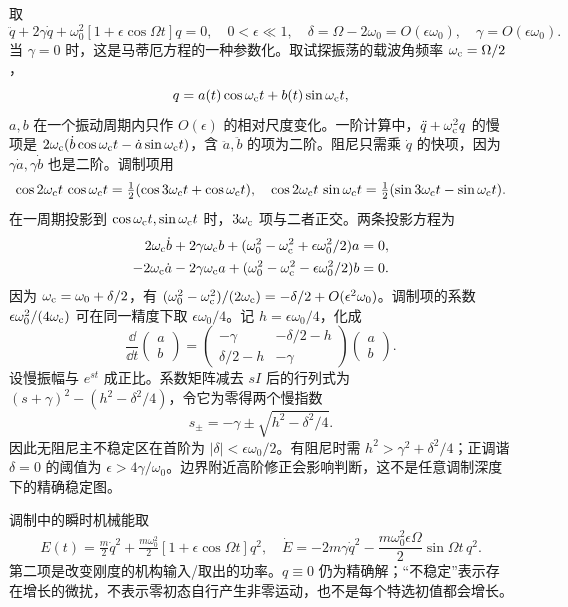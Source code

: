 \begin{example}[刚度调制如何克服阻尼]
取
\begin{equation}
\ddot q+2\gamma\dot q+\omega_0^2[1+\epsilon\cos\Omega t]q=0,
\quad 0<\epsilon\ll1,\quad
\delta=\Omega-2\omega_0=O(\epsilon\omega_0),\quad
\gamma=O(\epsilon\omega_0).
\label{eq:mathieu}
\end{equation}
当 $\gamma=0$ 时，这是马蒂厄方程的一种参数化。取试探振荡的载波角频率 $\omega_{\rm c}=\Omega/2$，
\[
q=a(t)\cos\omega_{\rm c} t+b(t)\sin\omega_{\rm c} t,
\]
$a,b$ 在一个振动周期内只作 $O(\epsilon)$ 的相对尺度变化。一阶计算中，$\ddot q+\omega_{\rm c}^2q$ 的慢项是 $2\omega_{\rm c}(\dot b\cos\omega_{\rm c} t-\dot a\sin\omega_{\rm c} t)$，含 $\ddot a,\ddot b$ 的项为二阶。阻尼只需乘 $\dot q$ 的快项，因为 $\gamma\dot a,\gamma\dot b$ 也是二阶。调制项用
\[
\cos2\omega_{\rm c} t\,\cos\omega_{\rm c} t=\tfrac12(\cos3\omega_{\rm c} t+\cos\omega_{\rm c} t),\quad
\cos2\omega_{\rm c} t\,\sin\omega_{\rm c} t=\tfrac12(\sin3\omega_{\rm c} t-\sin\omega_{\rm c} t).
\]
在一周期投影到 $\cos\omega_{\rm c} t,\sin\omega_{\rm c} t$ 时，$3\omega_{\rm c}$ 项与二者正交。两条投影方程为
\begin{align*}
2\omega_{\rm c}\dot b+2\gamma\omega_{\rm c} b+(\omega_0^2-\omega_{\rm c}^2+\epsilon\omega_0^2/2)a&=0,\\
-2\omega_{\rm c}\dot a-2\gamma\omega_{\rm c} a+(\omega_0^2-\omega_{\rm c}^2-\epsilon\omega_0^2/2)b&=0.
\end{align*}
因为 $\omega_{\rm c}=\omega_0+\delta/2$，有 $(\omega_0^2-\omega_{\rm c}^2)/(2\omega_{\rm c})=-\delta/2+O(\epsilon^2\omega_0)$。调制项的系数 $\epsilon\omega_0^2/(4\omega_{\rm c})$ 可在同一精度下取 $\epsilon\omega_0/4$。记 $h=\epsilon\omega_0/4$，化成
\[
\frac{\dd}{\dd t}\begin{pmatrix}a\\b\end{pmatrix}
=\begin{pmatrix}-\gamma&-\delta/2-h\\\delta/2-h&-\gamma\end{pmatrix}
\begin{pmatrix}a\\b\end{pmatrix}.
\]
设慢振幅与 $e^{st}$ 成正比。系数矩阵减去 $sI$ 后的行列式为 $(s+\gamma)^2-(h^2-\delta^2/4)$，令它为零得两个慢指数
\begin{equation}
s_\pm=-\gamma\pm\sqrt{h^2-\delta^2/4}.
\label{eq:osc-param-growth}
\end{equation}
因此无阻尼主不稳定区在首阶为 $|\delta|<\epsilon\omega_0/2$。有阻尼时需 $h^2>\gamma^2+\delta^2/4$；正调谐 $\delta=0$ 的阈值为 $\epsilon>4\gamma/\omega_0$。边界附近高阶修正会影响判断，这不是任意调制深度下的精确稳定图。

调制中的瞬时机械能取
\[
E(t)=\tfrac m2\dot q^2+\tfrac{m\omega_0^2}2[1+\epsilon\cos\Omega t]q^2,
\quad
\dot E=-2m\gamma\dot q^2-\frac{m\omega_0^2\epsilon\Omega}{2}\sin\Omega t\,q^2.
\]
第二项是改变刚度的机构输入/取出的功率。$q\equiv0$ 仍为精确解；“不稳定”表示存在增长的微扰，不表示零初态自行产生非零运动，也不是每个特选初值都会增长。
\end{example}

